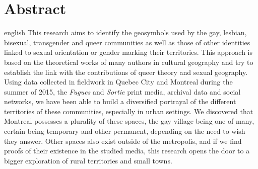 \chapter*{Abstract}                      %

\begin{otherlanguage*}{english}
This research aims to identify the geosymbols used by the gay, lesbian, bisexual, transgender and queer communities as well as those of other identities linked to sexual orientation or gender marking their territories.
  This approach is based on the theoretical works of many authors in cultural geography and try to establish the link with the contributions of queer theory and sexual geography.
  Using data collected in fieldwork in Quebec City and Montreal during the summer of 2015, the \emph{Fugues} and \emph{Sortie} print media, archival data and social networks, we have been able to build a diversified portrayal of the different territories of these communities, especially in urban settings.
  We discovered that Montreal possesses a plurality of these spaces, the gay village being one of many, certain being temporary and other permanent, depending on the need to wish they answer.
  Other spaces also exist outside of the metropolis, and if we find proofs of their existence in the studied media, this research opens the door to a bigger exploration of rural territories and small towns.
\end{otherlanguage*}
